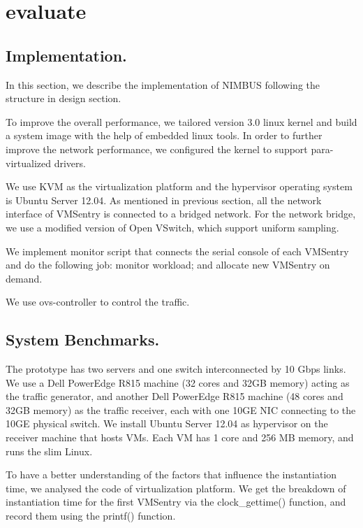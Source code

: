 \section{evaluate}
\subsection{Implementation.}
In this section, we describe the implementation of NIMBUS following the structure in design section.

To improve the overall performance, we tailored version 3.0 linux kernel and build a system image with the help of embedded linux tools. In order to further improve the network performance, we configured the kernel to support para-virtualized drivers.

We use KVM as the virtualization platform and the hypervisor operating system is Ubuntu Server 12.04. As mentioned in previous section, all the network interface of VMSentry is connected to a bridged network. For the network bridge, we use a modified version of Open VSwitch, which support uniform sampling.

We implement monitor script that connects the serial console of each VMSentry and do the following job: monitor workload; and allocate new VMSentry on demand.

We use ovs-controller to control the traffic.

\subsection{System Benchmarks.}
The prototype has two servers and one switch interconnected by 10 Gbps links. We use a Dell PowerEdge R815 machine (32 cores and 32GB memory) acting as the traffic generator, and another Dell PowerEdge R815 machine (48 cores and 32GB memory) as the traffic receiver, each with one 10GE NIC connecting to the 10GE physical switch. We install Ubuntu Server 12.04 as hypervisor on the receiver machine that hosts VMs. Each VM has 1 core and 256 MB memory, and runs the slim Linux.

To have a better understanding of the factors that influence the instantiation time, we analysed the code of virtualization platform. We get the breakdown of instantiation time for the first VMSentry via the clock\_gettime() function, and record them using the printf() function.

